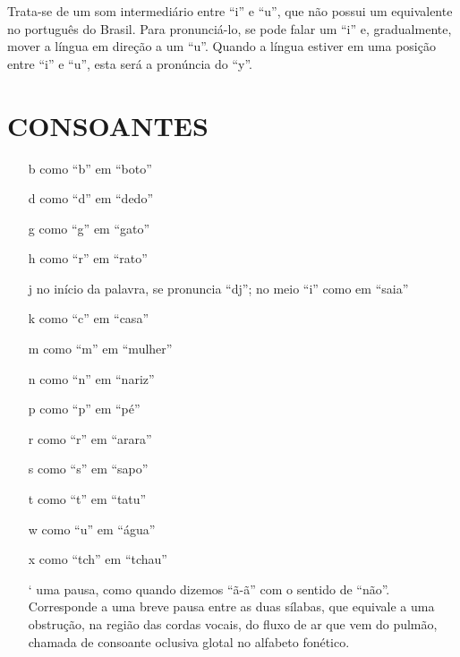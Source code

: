 Trata-se de um som intermediário entre ``i'' e ``u'', que não possui um
equivalente no português do Brasil. Para pronunciá-lo, se pode falar um
``i'' e, gradualmente, mover a língua em direção a um ``u''. Quando a
língua estiver em uma posição entre ``i'' e ``u'', esta será a pronúncia
do ``y''.

\section{CONSOANTES}

\begin{itemize}
\item[b] como ``b'' em ``boto''

\item[d] como ``d'' em ``dedo''

\item[g] como ``g'' em ``gato''

\item[h] como ``r'' em ``rato''

\item[j] no início da palavra, se pronuncia ``dj''; no meio ``i'' como em ``saia''

\item[k] como ``c'' em ``casa''

\item[m] como ``m'' em ``mulher''

\item[n] como ``n'' em ``nariz''

\item[p] como ``p'' em ``pé''

\item[r] como ``r'' em ``arara''

\item[s] como ``s'' em ``sapo''

\item[t] como ``t'' em ``tatu''

\item[w] como ``u'' em ``água''

\item[x] como ``tch'' em ``tchau''

\item[`] uma pausa, como quando dizemos ``ã-ã'' com o sentido de ``não''.
Corresponde a uma breve pausa entre as duas sílabas, que equivale a uma
obstrução, na região das cordas vocais, do fluxo de ar que vem do
pulmão, chamada de consoante oclusiva glotal no alfabeto fonético.
\end{itemize}

